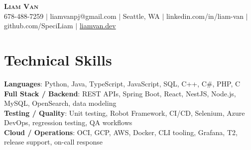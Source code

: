 \documentclass[letterpaper,11pt]{article}
\begin{document}

%
\begin{center}
    \textbf{\Huge \scshape Liam Van} \\ \vspace{1pt}
    \small 678-488-7259 $|$ \small {liamvanpj@gmail.com} $|$ Seattle, WA
 {{$|$ linkedin.com/in/liam-van} {$|$ github.com/SpeciLiam} {$|$ \href{https://liamvan.dev}{liamvan.dev}}}

\end{center}

\section{Technical Skills}
 \begin{itemize}[leftmargin=0.15in, label={}]
    \small{\item{
     \textbf{Languages}{: Python, Java, TypeScript, JavaScript, SQL, C++, C\#, PHP, C} \\
     \textbf{Full Stack / Backend}{: REST APIs, Spring Boot, React, NestJS, Node.js, MySQL, OpenSearch, data modeling} \\
     \textbf{Testing / Quality}{: Unit testing, Robot Framework, CI/CD, Selenium, Azure DevOps, regression testing, QA workflows} \\
     \textbf{Cloud / Operations}{: OCI, GCP, AWS, Docker, CLI tooling, Grafana, T2, release support, on-call response} \\
    }}
 \end{itemize}
%

\end{document}
